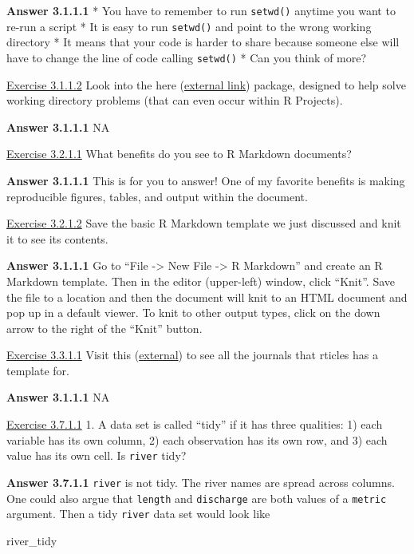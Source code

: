 \documentclass[
]{book}
\newenvironment{Shaded}{\begin{snugshade}}{\end{snugshade}}
\newcommand{\NormalTok}[1]{#1}
\begin{document}
\textbf{Answer 3.1.1.1}
* You have to remember to run \texttt{setwd()} anytime you want to re-run a script
* It is easy to run \texttt{setwd()} and point to the wrong working directory
* It means that your code is harder to share because someone else will have to change the line of code calling \texttt{setwd()}
* Can you think of more?

\protect\hyperlink{ex-set11}{Exercise 3.1.1.2}
Look into the here (\href{https://here.r-lib.org/}{external link}) package, designed to help solve working directory problems (that can even occur within R Projects).

\textbf{Answer 3.1.1.1}
NA

\protect\hyperlink{ex-set12}{Exercise 3.2.1.1}
What benefits do you see to R Markdown documents?

\textbf{Answer 3.1.1.1}
This is for you to answer! One of my favorite benefits is making reproducible figures, tables, and output within the document.

\protect\hyperlink{ex-set12}{Exercise 3.2.1.2}
Save the basic R Markdown template we just discussed and knit it to see its contents.

\textbf{Answer 3.1.1.1}
Go to ``File -\textgreater{} New File -\textgreater{} R Markdown'' and create an R Markdown template. Then in the editor (upper-left) window, click ``Knit''. Save the file to a location and then the document will knit to an HTML document and pop up in a default viewer. To knit to other output types, click on the down arrow to the right of the ``Knit'' button.

\protect\hyperlink{ex-set13}{Exercise 3.3.1.1}
Visit this (\href{https://github.com/rstudio/rticles}{external}) to see all the journals that rticles has a template for.

\textbf{Answer 3.1.1.1}
NA

\protect\hyperlink{ex-set14}{Exercise 3.7.1.1}
1. A data set is called ``tidy'' if it has three qualities: 1) each variable has its own column, 2) each observation has its own row, and 3) each value has its own cell. Is \texttt{river} tidy?

\textbf{Answer 3.7.1.1}
\texttt{river} is not tidy. The river names are spread across columns. One could also argue that \texttt{length} and \texttt{discharge} are both values of a \texttt{metric} argument. Then a tidy \texttt{river} data set would look like

\begin{Shaded}
\begin{Highlighting}[]
\NormalTok{river_tidy}
\end{Highlighting}
\end{Shaded}
\end{document}
